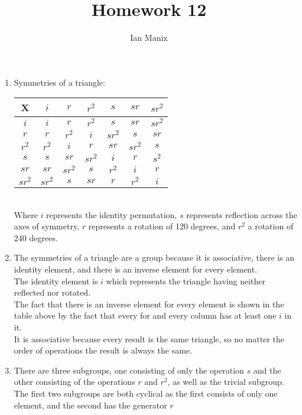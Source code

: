 \documentclass[sigconf]{article}
\title{
  \textbf{Homework 12} \\
  }
\author{ 
  Ian Manix
  }
\begin{document}



\maketitle




\begin{enumerate}
  \item Symmetries of a triangle:\\
      \begin{tabular}{c|cccccc}
      X      & $i$    & $r$    & $r^2$ & $s$ & $sr$ & $sr^2$ \\
      \hline
      $i$    & $i$    & $r$    & $r^2$  & $s$    & $sr$   & $sr^2$ \\
      $r$    & $r$    & $r^2$  & $i$    & $sr^2$ & $s$    & $sr$ \\
      $r^2$  & $r^2$  & $i$    & $r$    & $sr$   & $sr^2$ & $s$\\
      $s$    & $s$    & $sr$   & $sr^2$ & $i$    & $r$    & $s^2$\\
      $sr$   & $sr$   & $sr^2$ & $s$    & $r^2$  & $i$    & $r$\\
      $sr^2$ & $sr^2$ & $s$    & $sr$   & $r$    & $r^2$  & $i$\\
    \end{tabular}\\
    Where $i$ represents the identity permutation, $s$ represents reflection across the axes of symmetry, $r$ represents a rotation of 120 degrees, and $r^2$ a rotation of 240 degrees.
  \item The symmetries of a triangle are a group because it is associative, there is an identity element, and there is an inverse element for every element.\\
      The identity element is $i$ which represents the triangle having neither reflected nor rotated.\\
      The fact that there is an inverse element for every element is shown in the table above by the fact that every for and every column has at least one $i$ in it.\\
      It is associative because every result is the same triangle, so no matter the order of operations the result is always the same.
  \item There are three subgroups, one consisting of only the operation $s$ and the other consisting of the operations $r$ and $r^2$, as well as the trivial subgroup. The first two subgroups are both cyclical as the first consists of only one element, and the second has the generator $r$

\end{enumerate}
\end{document}
